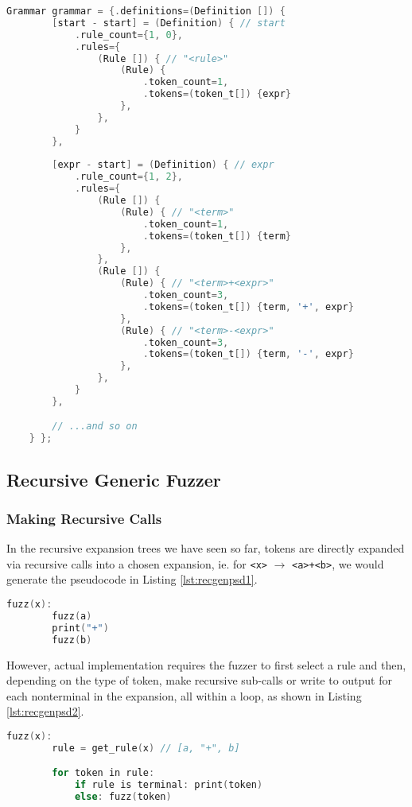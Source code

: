 \documentclass[8pt, twoside]{extarticle}
\begin{document}
\begin{lstlisting}[gobble=2, language=C, caption={Generic grammar snippet}]
	Grammar grammar = {.definitions=(Definition []) {
		[start - start] = (Definition) { // start
			.rule_count={1, 0}, 
			.rules={
				(Rule []) { // "<rule>"
					(Rule) { 
						.token_count=1, 
						.tokens=(token_t[]) {expr} 
					},
				},
			} 
		},
		
		[expr - start] = (Definition) { // expr
			.rule_count={1, 2}, 
			.rules={
				(Rule []) {
					(Rule) { // "<term>"
						.token_count=1, 
						.tokens=(token_t[]) {term} 
					},
				},
				(Rule []) {
					(Rule) { // "<term>+<expr>"
						.token_count=3, 
						.tokens=(token_t[]) {term, '+', expr} 
					},
					(Rule) { // "<term>-<expr>"
						.token_count=3, 
						.tokens=(token_t[]) {term, '-', expr} 
					},
				},
			} 
		},

		// ...and so on
	} };
\end{lstlisting}

\subsection{Recursive Generic Fuzzer}

\subsubsection{Making Recursive Calls}

In the recursive expansion trees we have seen so far, tokens are directly expanded via recursive calls into a chosen expansion, ie. for \verb|<x>| $\rightarrow$ \verb|<a>+<b>|, we would generate the pseudocode in Listing \ref{lst:recgenpsd1}.

\begin{lstlisting}[gobble=2, language=C, caption={Recursive expansion}, label=lst:recgenpsd1] 
	fuzz(x):
		fuzz(a)
		print("+")
		fuzz(b)
\end{lstlisting}

However, actual implementation requires the fuzzer to first select a rule and then, depending on the type of token, make recursive sub-calls or write to output for each nonterminal in the expansion, all within a loop, as shown in Listing \ref{lst:recgenpsd2}.

\begin{lstlisting}[gobble=2, language=C, caption={Realistic evaluation}, label=lst:recgenpsd2] 
	fuzz(x):
		rule = get_rule(x) // [a, "+", b]

		for token in rule:
			if rule is terminal: print(token)
			else: fuzz(token)
\end{lstlisting}
\end{document}
